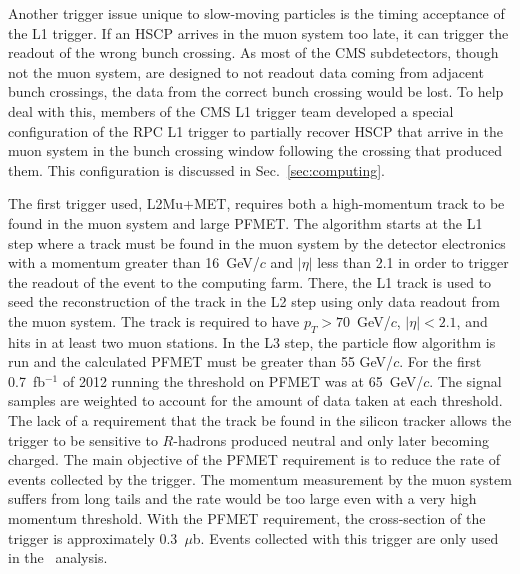 Another trigger issue unique to slow-moving particles is the timing acceptance of the L1 trigger. If an HSCP arrives in the muon system too late, it can trigger the
readout of the wrong bunch crossing. As most of the CMS subdetectors, though not the muon system, are designed to not readout data coming from adjacent bunch crossings,
the data from the correct bunch crossing would be lost. To help deal with this, members of the CMS L1 trigger team developed a special configuration of the
RPC L1 trigger to partially recover HSCP that arrive in the muon system in the bunch crossing window following the crossing that produced them.
This configuration is discussed in Sec.~\ref{sec:computing}.


The first trigger used, L2Mu+MET, requires both a high-momentum track to be found in the muon system and large PFMET.
The algorithm starts at the L1 step where a track must be found in the muon system by the detector electronics with a momentum greater than 16~GeV/$c$ and $|\eta|$ less than 2.1 
in order to trigger the readout of the event to the computing farm.
There, the L1 track is used to seed the reconstruction of the track in the L2 step using only data readout from the muon system.
The track is required to have $p_T > 70$~GeV/$c$, $|\eta| < 2.1$, and hits in at least two muon stations.
In the L3 step, the particle flow algorithm is run and the calculated PFMET must be greater than 55 GeV/$c$.
For the first 0.7~fb$^{-1}$ of 2012 running the threshold on PFMET was at 65~GeV/$c$. The signal samples are weighted
to account for the amount of data taken at each threshold.
The lack of a requirement that the track be found in the silicon tracker allows the trigger to be sensitive to $R$-hadrons produced neutral and only later becoming charged.
The main objective of the PFMET requirement is to reduce the rate of events collected by the trigger.
The momentum measurement by the muon system suffers from long tails and the rate would be too large even with a very high momentum threshold.
With the PFMET requirement, the cross-section of the trigger is approximately 0.3~$\mu$b.
Events collected with this trigger are only used in the \muononly\ analysis.

